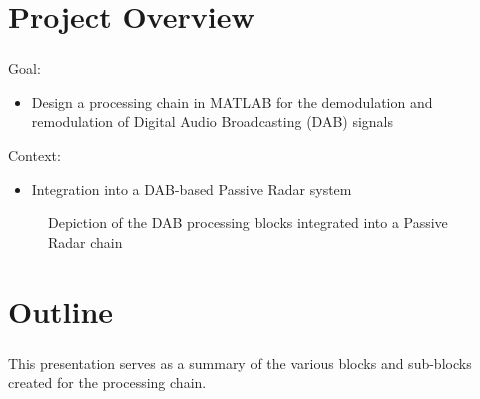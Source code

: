 \documentclass[class=beamer,10pt,crop=false]{standalone}
\begin{document}
 

\section{Project Overview}
\begin{frame}
    \frametitle{\secname}

    Goal:
    \begin{itemize}
        \item Design a processing chain in MATLAB for the demodulation and remodulation of  Digital Audio Broadcasting (DAB) signals
    \end{itemize}
    
    Context:
    \begin{itemize}
        \item Integration into a DAB-based Passive Radar system
    \end{itemize}

    \begin{figure}[htbp]
        \centering
        \captionsetup{type=figure}
        \def\svgwidth{\linewidth}
        {\linespread{0.8}
        \tiny
        }
        \caption{Depiction of the DAB processing blocks integrated into a Passive Radar chain}
        \label{fig:BD_pr-integration}
    \end{figure}

\end{frame}

\section{Outline}
\begin{frame}
    \frametitle{\secname}
    
    This presentation serves as a summary of the various blocks and sub-blocks created for the processing chain.

\end{frame}
\end{document}

